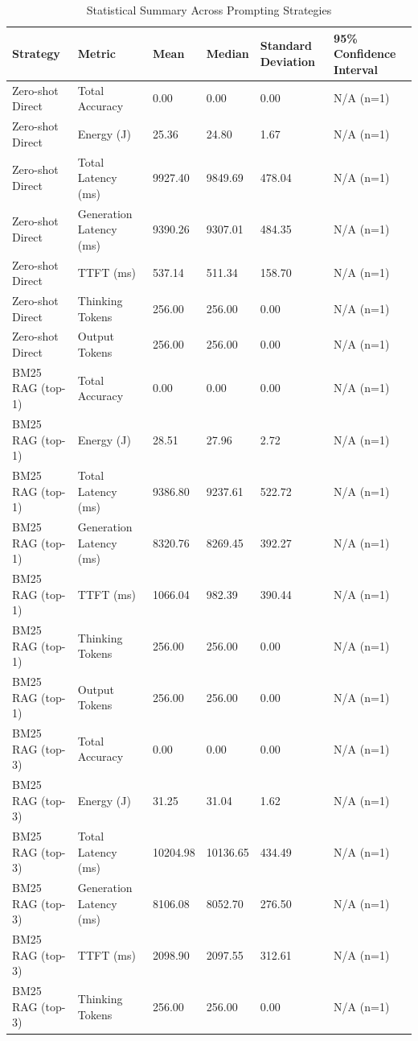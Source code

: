 \begin{table}
\caption{Statistical Summary Across Prompting Strategies}
\label{tab:statistical_summary}
\begin{tabular}{llllll}
\toprule
Strategy & Metric & Mean & Median & Standard Deviation & 95\% Confidence Interval \\
\midrule
Zero-shot Direct & Total Accuracy & 0.00 & 0.00 & 0.00 & N/A (n=1) \\
Zero-shot Direct & Energy (J) & 25.36 & 24.80 & 1.67 & N/A (n=1) \\
Zero-shot Direct & Total Latency (ms) & 9927.40 & 9849.69 & 478.04 & N/A (n=1) \\
Zero-shot Direct & Generation Latency (ms) & 9390.26 & 9307.01 & 484.35 & N/A (n=1) \\
Zero-shot Direct & TTFT (ms) & 537.14 & 511.34 & 158.70 & N/A (n=1) \\
Zero-shot Direct & Thinking Tokens & 256.00 & 256.00 & 0.00 & N/A (n=1) \\
Zero-shot Direct & Output Tokens & 256.00 & 256.00 & 0.00 & N/A (n=1) \\
BM25 RAG (top-1) & Total Accuracy & 0.00 & 0.00 & 0.00 & N/A (n=1) \\
BM25 RAG (top-1) & Energy (J) & 28.51 & 27.96 & 2.72 & N/A (n=1) \\
BM25 RAG (top-1) & Total Latency (ms) & 9386.80 & 9237.61 & 522.72 & N/A (n=1) \\
BM25 RAG (top-1) & Generation Latency (ms) & 8320.76 & 8269.45 & 392.27 & N/A (n=1) \\
BM25 RAG (top-1) & TTFT (ms) & 1066.04 & 982.39 & 390.44 & N/A (n=1) \\
BM25 RAG (top-1) & Thinking Tokens & 256.00 & 256.00 & 0.00 & N/A (n=1) \\
BM25 RAG (top-1) & Output Tokens & 256.00 & 256.00 & 0.00 & N/A (n=1) \\
BM25 RAG (top-3) & Total Accuracy & 0.00 & 0.00 & 0.00 & N/A (n=1) \\
BM25 RAG (top-3) & Energy (J) & 31.25 & 31.04 & 1.62 & N/A (n=1) \\
BM25 RAG (top-3) & Total Latency (ms) & 10204.98 & 10136.65 & 434.49 & N/A (n=1) \\
BM25 RAG (top-3) & Generation Latency (ms) & 8106.08 & 8052.70 & 276.50 & N/A (n=1) \\
BM25 RAG (top-3) & TTFT (ms) & 2098.90 & 2097.55 & 312.61 & N/A (n=1) \\
BM25 RAG (top-3) & Thinking Tokens & 256.00 & 256.00 & 0.00 & N/A (n=1) \\

\end{tabular}
\end{table}
